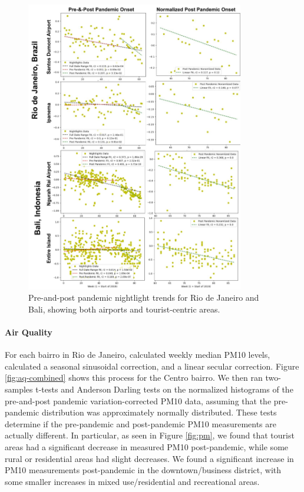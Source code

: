\begin{figure}[!htb] 
\centering
\includegraphics[width=0.85\textwidth]{Figures/chap5/Nightlights_Graphs.png}
\caption[Nightlight Trends for Rio de Janeiro and Bali]{Pre-and-post pandemic nightlight trends for Rio de Janeiro and Bali, showing both airports and tourist-centric areas.}
\label{fig:nlg}
\end{figure}

\paragraph{Air Quality} \leavevmode\newline

For each bairro in Rio de Janeiro, calculated weekly median PM10 levels, calculated a seasonal sinusoidal correction, and a linear secular correction. Figure \ref{fig:aq-combined} shows this process for the Centro bairro. We then ran two-samples t-tests and Anderson Darling tests on the normalized histograms of the pre-and-post pandemic variation-corrected PM10 data, assuming that the pre-pandemic distribution was approximately normally distributed. These tests determine if the pre-pandemic and post-pandemic PM10 measurements are actually different. In particular, as seen in Figure \ref{fig:pm}, we found that tourist areas had a significant decrease in measured PM10 post-pandemic, while some rural or residential areas had slight decreases. We found a significant increase in PM10 measurements post-pandemic in the downtown/business district, with some smaller increases in mixed use/residential and recreational areas. 

